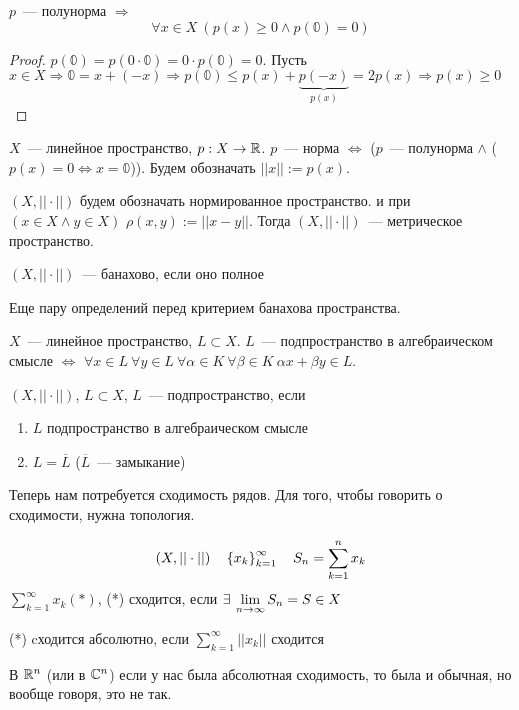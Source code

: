 \documentclass[document]{subfiles}
\begin{document}
\begin{property}
    $p$~--- полунорма $\Rightarrow$
    \[ \forall x \in X \: (p(x) \geq 0 \land p(\mathbb{0}) = 0) \]
\end{property}

\begin{proof}
    $p(\mathbb{0}) = p(0 \cdot \mathbb{0}) = 0 \cdot p(\mathbb{0}) = 0$.
    Пусть $x \in X \Rightarrow \mathbb{0} = x + (-x) \Rightarrow p(\mathbb{0}) \leq p(x) + \underbrace{p(-x)}_{p(x)} = 2p(x) \Rightarrow p(x) \geq 0$
\end{proof}

\begin{definition}[Норма]
    $X$~--- линейное пространство, $p : X \rightarrow \mathbb{R}$. $p$~--- норма $\Leftrightarrow $ ($p$~--- полунорма $\land $ ($p(x) = 0 \Leftrightarrow x = \mathbb{0}$)).
    Будем обозначать $||x|| := p(x)$.
\end{definition}
$(X, || \cdot ||)$ будем обозначать нормированное пространство. и при $(x \in X \land y \in X)$ $\rho(x,y) := ||x-y||$. Тогда $(X,||\cdot ||)$~--- метрическое пространство.

\begin{definition}
    $(X, || \cdot ||)$~--- банахово, если оно полное
\end{definition}
Еще пару определений перед критерием банахова пространства.

\begin{definition}
    $X$~--- линейное пространство, $L \subset X$. $L$~--- подпространство в алгебраическом смысле $\Leftrightarrow$ $\forall x \in L \: \forall y \in L \: \forall \alpha \in K \: \forall \beta \in K \: \alpha x + \beta y \in L$.
\end{definition}

\begin{definition}[подпространство]
    $(X, || \cdot ||)$, $L \subset X$, $L$~--- подпространство, если
    \begin{enumerate}
        \item $L$ подпространство в алгебраическом смысле
        \item $L = \overline{L}$ ($\overline{L}$~--- замыкание)
    \end{enumerate}
\end{definition}

Теперь нам потребуется сходимость рядов. Для того, чтобы говорить о сходимости, нужна топология.

\begin{definition}[Cходимость]
    \[(X, || \cdot ||) \quad \left\{x_k\right\}^\infty_{k=1} \quad S_n = \sum^n_{k=1} x_k \]
    $\sum_{k=1}^\infty x_k (*)$,  
    (*) сходится, если $\exists \liml_{n \to \infty}{S_n} = S \in X$

    (*) cходится абсолютно, если $\sum^\infty_{k=1} ||x_k||$ сходится
\end{definition}
В $\mathbb{R}^n$ (или в $\mathbb{C}^n$) если у нас была абсолютная сходимость, то была и обычная, но вообще говоря, это не так.
\end{document}
